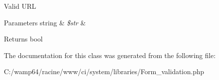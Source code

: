 Valid U\+RL


\begin{DoxyParams}[1]{Parameters}
string & {\em \$str} & \\
\hline
\end{DoxyParams}
\begin{DoxyReturn}{Returns}
bool 
\end{DoxyReturn}


The documentation for this class was generated from the following file\+:\begin{DoxyCompactItemize}
\item 
C\+:/wamp64/racine/www/ci/system/libraries/Form\+\_\+validation.\+php\end{DoxyCompactItemize}
